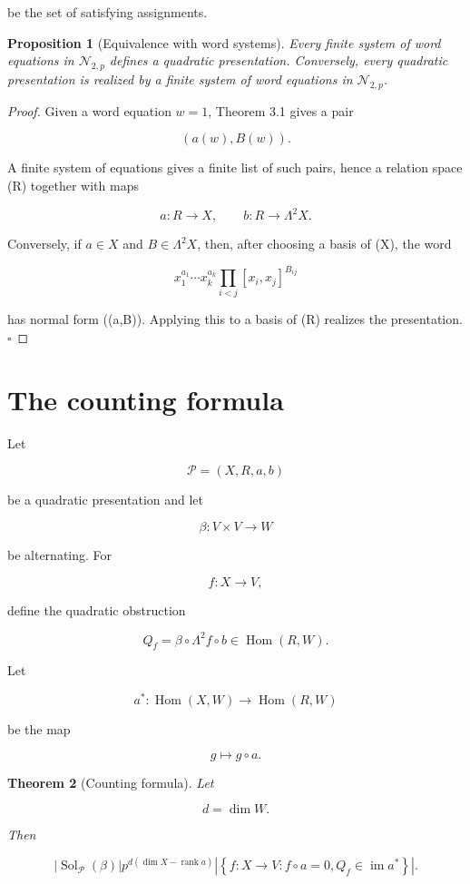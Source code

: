 \documentclass[11pt]{article}
\newtheorem{theorem}{Theorem}[section]
\newtheorem{proposition}[theorem]{Proposition}
\begin{document}
be the set of satisfying assignments.

\begin{proposition}[Equivalence with word systems]
Every finite system of word equations in $\mathcal N_{2,p}$ defines a quadratic presentation. Conversely, every quadratic presentation is realized by a finite system of word equations in $\mathcal N_{2,p}$.

\end{proposition}

\begin{proof}
Given a word equation $w=1$, Theorem 3.1 gives a pair

\[
(a(w),B(w)).
\]

A finite system of equations gives a finite list of such pairs, hence a relation space (R) together with maps

\[
a:R\to X,
\qquad
b:R\to\Lambda^2X.
\]

Conversely, if $a\in X$ and $B\in\Lambda^2X$, then, after choosing a basis of (X), the word

\[
x_1^{a_1}\cdots x_k^{a_k}
\prod_{i<j}[x_i,x_j]^{B_{ij}}
\]

has normal form ((a,B)). Applying this to a basis of (R) realizes the presentation. $\square$

\end{proof}

\section{The counting formula}

Let

\[
\mathcal P=(X,R,a,b)
\]

be a quadratic presentation and let

\[
\beta:V\times V\to W
\]

be alternating. For

\[
f:X\to V,
\]

define the quadratic obstruction

\[
Q_f=
\beta\circ\Lambda^2 f\circ b
\in \operatorname{Hom}(R,W).
\]

Let

\[
a^*:\operatorname{Hom}(X,W)\to \operatorname{Hom}(R,W)
\]

be the map

\[
g\mapsto g\circ a.
\]

\begin{theorem}[Counting formula]
Let

\[
d=\dim W.
\]

Then

\[
|\operatorname{Sol}_{\mathcal P}(\beta)|
p^{d(\dim X-\operatorname{rank}a)}
\left|
\left\{
f:X\to V:
f\circ a=0,
Q_f\in\operatorname{im}a^*
\right\}
\right|.
\]

\end{theorem}
\end{document}
